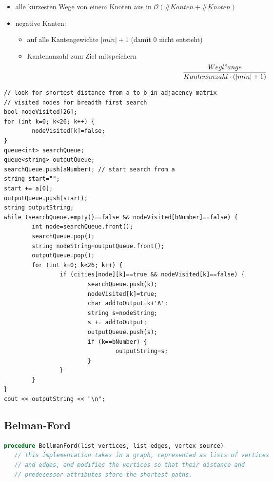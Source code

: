 \documentclass[10pt,a4paper,ngerman,oneside,]{article}
\begin{document}
\begin{multicols}{2}
			\begin{itemize}
				\item alle kürzesten Wege von einem Knoten aus in $\mathcal{O}(\#Kanten+\#Knoten)$
				\item negative Kanten: 
				\begin{itemize}
					\item auf alle Kantengewichte $|min|+1$ (damit 0 nicht entsteht)
					\item Kantenanzahl zum Ziel mitspeichern
					\begin{equation*}
						\frac{Wegl"ange}{Kantenanzahl \cdot (|min|+1)}
					\end{equation*}
				\end{itemize}
			\end{itemize}
				\lstset{language=c}
				\begin{lstlisting}
// look for shortest distance from a to b in adjacency matrix
// visited nodes for breadth first search
bool nodeVisited[26];
for (int k=0; k<26; k++) {
        nodeVisited[k]=false;
}
queue<int> searchQueue;
queue<string> outputQueue;
searchQueue.push(aNumber); // start search from a
string start="";
start += a[0];
outputQueue.push(start);
string outputString;
while (searchQueue.empty()==false && nodeVisited[bNumber]==false) {
        int node=searchQueue.front();
        searchQueue.pop();
        string nodeString=outputQueue.front();
        outputQueue.pop();
        for (int k=0; k<26; k++) {
                if (cities[node][k]==true && nodeVisited[k]==false) {
                        searchQueue.push(k);
                        nodeVisited[k]=true;
                        char addToOutput=k+'A';
                        string s=nodeString;
                        s += addToOutput;
                        outputQueue.push(s);
                        if (k==bNumber) {
                                outputString=s;
                        }
                }
        }
}
cout << outputString << "\n";	
\end{lstlisting}

\subsection{Belman-Ford}
\begin{lstlisting}[language=pascal]
procedure BellmanFord(list vertices, list edges, vertex source)
   // This implementation takes in a graph, represented as lists of vertices
   // and edges, and modifies the vertices so that their distance and
   // predecessor attributes store the shortest paths.


\end{lstlisting}
\end{multicols}
\end{document}

